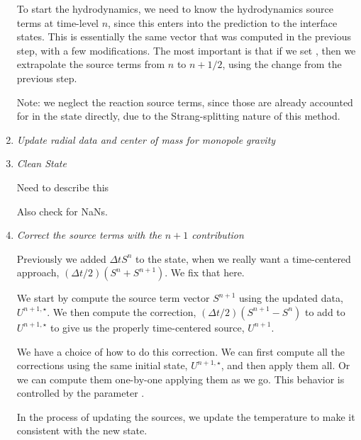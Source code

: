 \begin{enumerate}
To start the hydrodynamics, we need to know the hydrodynamics source
terms at time-level $n$, since this enters into the prediction to the
interface states.  This is essentially the same vector that was
computed in the previous step, with a few modifications.  The most
important is that if we set ,
then we extrapolate the source terms from $n$ to $n+1/2$, using the
change from the previous step. 

Note: we neglect the reaction source terms, since those are already
accounted for in the state directly, due to the Strang-splitting 
nature of this method.


\item {\em Update radial data and center of mass for monopole gravity}


\item {\em Clean State}

Need to describe this

Also check for NaNs.


\item {\em Correct the source terms with the $n+1$ contribution}

Previously we added $\Delta t S^n$ to the state, when we really want
a time-centered approach, $(\Delta t/2)(S^n + S^{n+1})$.  We fix 
that here.

We start by compute the source term vector $S^{n+1}$ using the 
updated data, $U^{n+1,\star}$.  We then compute the correction,
$(\Delta t/2)(S^{n+1} - S^n)$ to add to $U^{n+1,\star}$ to
give us the properly time-centered source, $U^{n+1}$.

We have a choice of how to do this correction.  We can first compute
all the corrections using the same initial state, $U^{n+1,\star}$, and
then apply them all.  Or we can compute them one-by-one applying them
as we go.  This behavior is controlled by the parameter
.

In the process of updating the sources, we update the temperature
to make it consistent with the new state.




\end{enumerate}
